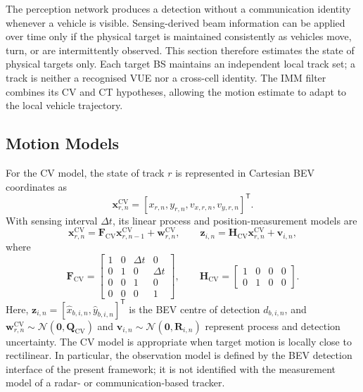 The perception network produces a detection without a communication identity
whenever a vehicle is visible.  Sensing-derived beam information can be applied
over time only if the physical target is maintained consistently as vehicles
move, turn, or are intermittently observed.  This section therefore estimates
the state of physical targets only.  Each target BS maintains an independent
local track set; a track is neither a recognised VUE nor a cross-cell identity.
The IMM filter combines its CV and CT hypotheses, allowing the motion estimate
to adapt to the local vehicle
trajectory.

\subsection{Motion Models}
\label{subsec:method-motion-models}

For the CV model, the state of track \(r\) is represented in Cartesian BEV
coordinates as
\begin{equation}
    \mathbf{x}^{\mathrm{CV}}_{r,n}
    =
    [x_{r,n},y_{r,n},v_{x,r,n},v_{y,r,n}]^{\mathsf T}.
    \label{eq:method-cv-state}
\end{equation}
With sensing interval \(\Delta t\), its linear process and position-measurement
models are
\begin{equation}
    \mathbf{x}^{\mathrm{CV}}_{r,n}
    =
    \mathbf{F}_{\mathrm{CV}}\mathbf{x}^{\mathrm{CV}}_{r,n-1}
    +\mathbf{w}^{\mathrm{CV}}_{r,n},
    \qquad
    \mathbf{z}_{i,n}
    =
    \mathbf{H}_{\mathrm{CV}}\mathbf{x}^{\mathrm{CV}}_{r,n}
    +\mathbf{v}_{i,n},
    \label{eq:method-cv-model}
\end{equation}
where
\begin{equation}
    \mathbf{F}_{\mathrm{CV}}
    =
    \begin{bmatrix}
        1&0&\Delta t&0\\
        0&1&0&\Delta t\\
        0&0&1&0\\
        0&0&0&1
    \end{bmatrix},
    \qquad
    \mathbf{H}_{\mathrm{CV}}
    =
    \begin{bmatrix}
        1&0&0&0\\
        0&1&0&0
    \end{bmatrix}.
    \label{eq:method-cv-matrices}
\end{equation}
Here, \(\mathbf{z}_{i,n}=[\widehat{x}_{b,i,n},\widehat{y}_{b,i,n}]^{\mathsf T}\)
is the BEV centre of detection \(d_{b,i,n}\), and
\(\mathbf{w}^{\mathrm{CV}}_{r,n}\sim\mathcal{N}(\mathbf{0},\mathbf{Q}_{\mathrm{CV}})\)
and \(\mathbf{v}_{i,n}\sim\mathcal{N}(\mathbf{0},\mathbf{R}_{i,n})\) represent
process and detection uncertainty.  The CV model is appropriate when target
motion is locally close to rectilinear.  In particular, the observation model
is defined by the BEV detection interface of the present framework; it is not
identified with the measurement model of a radar- or communication-based
tracker.

